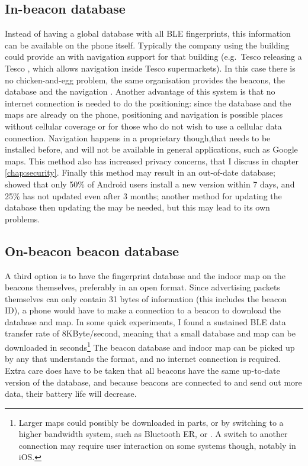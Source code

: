 \subsection{In-\app beacon database}
Instead of having a global database with all BLE fingerprints, this information can be available on the phone itself.
Typically the company using the building could provide an \app with navigation support for that building (e.g.\ Tesco releasing a Tesco \app, which allows navigation inside Tesco supermarkets).
In this case there is no chicken-and-egg problem, the same organisation provides the beacons, the database and the navigation \app.
Another advantage of this system is that no internet connection is needed to do the positioning: since the database and the maps are already on the phone, positioning and navigation is possible places without cellular coverage or for those who do not wish to use a cellular data connection.
Navigation happens in a proprietary \app though,that needs to be installed before, and will not be available in general applications, such as Google maps.
This method also has increased privacy concerns, that I discuss in chapter \ref{chap:security}.
Finally this method may result in an out-of-date database; \citet{moller2012update} showed that only 50\% of Android users install a new \app version within 7 days, and 25\% has not updated even after 3 months; another method for updating the database then updating the \app may be needed, but this may lead to its own problems.

\subsection{On-beacon beacon database}
A third option is to have the fingerprint database and the indoor map on the beacons themselves, preferably in an open format.
Since advertising packets themselves can only contain 31 bytes of information (this includes the beacon ID), a phone would have to make a connection to a beacon to download the database and map.
In some quick experiments, I found a sustained BLE data transfer rate of 8KByte/second, meaning that a small database and map can be downloaded in seconds\footnote{Larger maps could possibly be downloaded in parts, or by switching to a higher bandwidth system, such as Bluetooth ER, or \wifi. A switch to another connection may require user interaction on some systems though, notably in iOS.}
The beacon database and indoor map can be picked up by any \app that understands the format, and no internet connection is required.
Extra care does have to be taken that all beacons have the same up-to-date version of the database, and because beacons are connected to and send out more data, their battery life will decrease.

